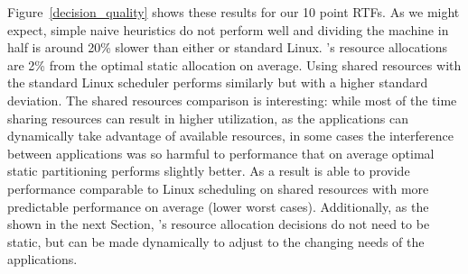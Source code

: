 Figure~\ref{decision_quality} shows these results for our 10 point RTFs. As we might expect, simple naive heuristics do not perform well and dividing the machine in half is around 20\% slower than either \pacora or standard Linux.
 \pacora's resource allocations are 2\% from the optimal static allocation on average.  Using shared resources with the standard Linux scheduler performs similarly but with a higher standard deviation.  The shared resources comparison is interesting: while most of the time sharing resources can result in higher utilization, as the applications can dynamically take advantage of available resources, in some cases the interference between applications was so harmful to performance that on average optimal static partitioning performs slightly better.  As a result \pacora is able to provide performance comparable to Linux scheduling on shared resources with more predictable performance on average (lower worst cases).  Additionally, as the shown in the next Section, \pacora's resource allocation decisions do not need to be static, but can be made dynamically to adjust to the changing needs of the applications.



